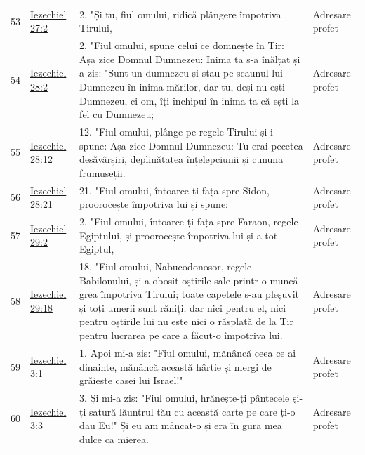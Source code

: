 \documentclass[12pt,a4paper,twoside,openany]{book}
\begin{document}
\begin{longtable}{L{0.8cm}L{1.2cm}L{11.9cm}L{0.8cm}}
53 & \href{https://bibliaortodoxa.ro/carte.php?id=33\&cap=27\#2}{Iezechiel 27:2} & 2. "Și tu, fiul omului, ridică plângere împotriva Tirului, & Adresare profet \\
54 & \href{https://bibliaortodoxa.ro/carte.php?id=33\&cap=28\#2}{Iezechiel 28:2} & 2. "Fiul omului, spune celui ce domnește în Tir: Așa zice Domnul Dumnezeu: Inima ta s-a înălțat și a zis: "Sunt un dumnezeu și stau pe scaunul lui Dumnezeu în inima mărilor, dar tu, deși nu ești Dumnezeu, ci om, îți închipui în inima ta că ești la fel cu Dumnezeu; & Adresare profet \\
55 & \href{https://bibliaortodoxa.ro/carte.php?id=33\&cap=28\#12}{Iezechiel 28:12} & 12. "Fiul omului, plânge pe regele Tirului și-i spune: Așa zice Domnul Dumnezeu: Tu erai pecetea desăvârșiri, deplinătatea înțelepciunii și cununa frumuseții. & Adresare profet \\
56 & \href{https://bibliaortodoxa.ro/carte.php?id=33\&cap=28\#21}{Iezechiel 28:21} & 21. "Fiul omului, întoarce-ți fața spre Sidon, proorocește împotriva lui și spune: & Adresare profet \\
57 & \href{https://bibliaortodoxa.ro/carte.php?id=33\&cap=29\#2}{Iezechiel 29:2} & 2. "Fiul omului, întoarce-ți fața spre Faraon, regele Egiptului, și proorocește împotriva lui și a tot Egiptul, & Adresare profet \\
58 & \href{https://bibliaortodoxa.ro/carte.php?id=33\&cap=29\#18}{Iezechiel 29:18} & 18. "Fiul omului, Nabucodonosor, regele Babilonului, și-a obosit oștirile sale printr-o muncă grea împotriva Tirului; toate capetele s-au pleșuvit și toți umerii sunt răniți; dar nici pentru el, nici pentru oștirile lui nu este nici o răsplată de la Tir pentru lucrarea pe care a făcut-o împotriva lui. & Adresare profet \\
59 & \href{https://bibliaortodoxa.ro/carte.php?id=33\&cap=3\#1}{Iezechiel 3:1} & 1. Apoi mi-a zis: "Fiul omului, mănâncă ceea ce ai dinainte, mănâncă această hârtie și mergi de grăiește casei lui Israel!" & Adresare profet \\
60 & \href{https://bibliaortodoxa.ro/carte.php?id=33\&cap=3\#3}{Iezechiel 3:3} & 3. Și mi-a zis: "Fiul omului, hrănește-ți pântecele și-ți satură lăuntrul tău cu această carte pe care ți-o dau Eu!" Și eu am mâncat-o și era în gura mea dulce ca mierea. & Adresare profet \\

\end{longtable}
\end{document}
